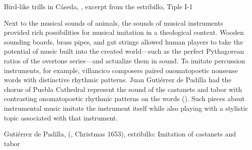 
{Bird-like trills in Cáseda, , excerpt from the
estribillo, Tiple I-1}

Next to the musical sounds of animals, the sounds of musical instruments
provided rich possibilities for musical imitation in a theological context.
Wooden sounding boards, brass pipes, and gut strings allowed human players to
take the potential of music built into the created world---such as the perfect
Pythagorean ratios of the overtone series---and actualize them in sound.
To imitate percussion instruments, for example, villancico composers paired
onomatopoetic nonsense words with distinctive rhythmic patterns.
Juan Gutiérrez de Padilla had the chorus of Puebla Cathedral represent the
sound of the castanets and tabor with contrasting onomatopoetic rhythmic
patterns on the words  ().
Such pieces about instrumental music imitate the instrument itself while also
playing with a stylistic topic associated with that instrument.


{Gutiérrez de Padilla, 
(, Christmas 1653), estribillo: Imitation of castanets
and tabor}

